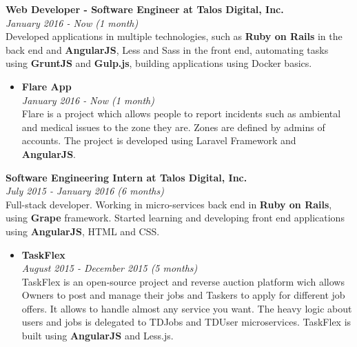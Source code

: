 \documentclass[margin, 10pt]{res} %
\begin{document}
\begin{resume}
\textbf{Web Developer - Software Engineer at Talos Digital, Inc.} \\
\textit{January 2016 - Now (1 month)} \\
Developed applications in multiple technologies, such as \textbf{Ruby on Rails} in the back end and
\textbf{AngularJS}, Less and Sass in the front end, automating tasks using \textbf{GruntJS} and
\textbf{Gulp.js}, building applications using Docker basics.
\begin{itemize}
  \item \textbf{Flare App} \\
        \textit{January 2016 - Now (1 month)} \\
        Flare is a project which allows people to report incidents such as ambiental and medical
        issues to the zone they are. Zones are defined by admins of accounts. The project is
        developed using Laravel Framework and \textbf{AngularJS}. \\
\end{itemize}

\textbf{Software Engineering Intern at Talos Digital, Inc.} \\
\textit{July 2015 - January 2016 (6 months)} \\
Full-stack developer. Working in micro-services back end in \textbf{Ruby on Rails}, using
\textbf{Grape} framework. Started learning and developing front end applications using
\textbf{AngularJS}, HTML and CSS.

\begin{itemize}
  \item \textbf{TaskFlex} \\
        \textit{August 2015 - December 2015 (5 months)} \\
        TaskFlex is an open-source project and reverse auction platform wich allows Owners to post
        and manage their jobs and Taskers to apply for different job offers. It allows to handle
        almost any service you want. The heavy logic about users and jobs is delegated to TDJobs and
        TDUser microservices. TaskFlex is built using \textbf{AngularJS} and Less.js. \\


\end{itemize}
\end{resume}
\end{document}
